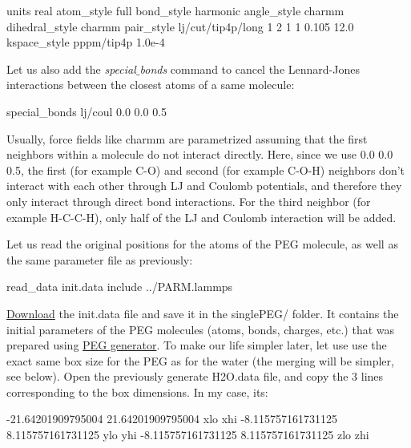 \begin{lcverbatim}
units real
atom_style full
bond_style harmonic
angle_style charmm
dihedral_style charmm
pair_style lj/cut/tip4p/long 1 2 1 1 0.105 12.0
kspace_style pppm/tip4p 1.0e-4
\end{lcverbatim}

\noindent Let us also add the \textit{special$\_$bonds} command to cancel the
Lennard-Jones interactions between the closest
atoms of a same molecule:

\begin{lcverbatim}
special_bonds lj/coul 0.0 0.0 0.5
\end{lcverbatim}

\noindent \begin{tcolorbox}[colback=mylightblue!5!white,colframe=mylightblue!75!black,title=About *special bonds*]
Usually, force fields like charmm are parametrized assuming that the first neighbors within a molecule do not
interact directly. Here, since we use 0.0 0.0 0.5, the first (for example C-O) and second (for example C-O-H) neighbors don't interact
with each other through LJ and Coulomb potentials, and therefore they only interact through direct bond interactions.
For the third neighbor (for example H-C-C-H), only half of the LJ and Coulomb interaction will be added.   
\end{tcolorbox}

\noindent Let us read the original positions for the atoms of the PEG molecule, as
well as the same parameter file as previously:

\begin{lcverbatim}
read_data init.data
include ../PARM.lammps
\end{lcverbatim}

\noindent \href{../../../../../inputs/level2/polymer-in-water/singlePEG/init.data}{Download}
the init.data file and save it in the singlePEG/ folder.
It contains the initial parameters of the PEG molecules
(atoms, bonds, charges, etc.) that was prepared using \href{https://github.com/simongravelle/PEGgenerator}{PEG generator}.
To make our life simpler later, let use use the exact same
box size for the PEG as for the water (the merging will be
simpler, see below). Open the previously generate H2O.data
file, and copy the 3 lines corresponding to the box
dimensions. In my case, its:

\begin{lcverbatim}
-21.64201909795004 21.64201909795004 xlo xhi
-8.115757161731125 8.115757161731125 ylo yhi
-8.115757161731125 8.115757161731125 zlo zhi
\end{lcverbatim}

